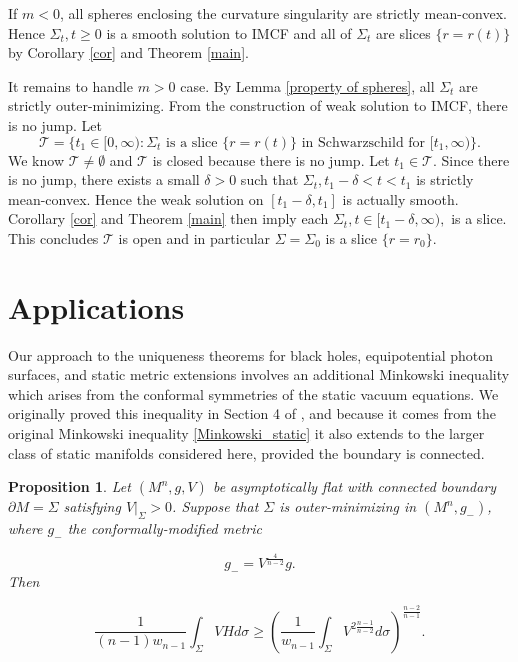 \documentclass[12pt,twoside]{article}
\theoremstyle{plain}
\newtheorem{prop}[theorem]{Proposition}
\theoremstyle{definition}
\theoremstyle{remark}
\numberwithin{equation}{section}
\begin{document}
If $m < 0$, all spheres enclosing the curvature singularity are strictly mean-convex. Hence $\Sigma_t, t \ge 0$ is a smooth solution to IMCF and all of $\Sigma_t$ are slices $\{ r=r(t) \}$ by Corollary \ref{cor} and Theorem \ref{main}.

It remains to handle $m > 0$ case. By Lemma \ref{property of spheres}, all $\Sigma_t$ are strictly outer-minimizing. From the construction of weak solution to IMCF, there is no jump. Let \[ \mathcal{T} = \{ t_1 \in [0,\infty): \Sigma_t \mbox{ is a slice $\{ r=r(t)\}$ in Schwarzschild for } [t_1,\infty) \}. \]
We know $\mathcal{T} \neq \emptyset$ and $\mathcal{T}$ is closed because there is no jump. Let $t_1 \in \mathcal{T}$. Since there is no jump, there exists a small $\delta > 0$ such that $\Sigma_t, t_1 -\delta < t < t_1$ is strictly mean-convex. Hence the weak solution on $[t_1 - \delta, t_1]$ is actually smooth. Corollary \ref{cor} and Theorem \ref{main} then imply each $\Sigma_t, t\in [t_1-\delta,\infty),$ is a slice. This concludes $\mathcal{T}$ is open and in particular $\Sigma = \Sigma_0$ is a slice $\{ r = r_0 \}$.     


\section{Applications}\label{section:applications}
Our approach to the uniqueness theorems for black holes, equipotential photon surfaces, and static metric extensions involves an additional Minkowski inequality which arises from the conformal symmetries of the static vacuum equations. We originally proved this inequality in Section 4 of \cite{HW}, and because it comes from the original Minkowski inequality \eqref{Minkowski_static} it also extends to the larger class of static manifolds considered here, provided the boundary is connected.
\begin{prop} \label{conformal_theorem}
Let $(M^{n},g,V)$ be asymptotically flat  with connected boundary $\partial M = \Sigma$ satisfying $V|_{\Sigma}>0$. Suppose that $\Sigma$ is outer-minimizing in $(M^{n},g_{-})$, where $g_{-}$ the conformally-modified metric

\begin{equation} \label{g_conf}
    g_{-}= V^{\frac{4}{n-2}} g.
\end{equation}
Then

\begin{equation} \label{conformal_ineq}
    \frac{1}{(n-1)w_{n-1}} \int_{\Sigma} VH d\sigma \geq \left( \frac{1}{w_{n-1}} \int_{\Sigma} V^{2 \frac{n-1}{n-2}} d\sigma \right)^{\frac{n-2}{n-1}}.
\end{equation}
\end{prop}
\end{document}
